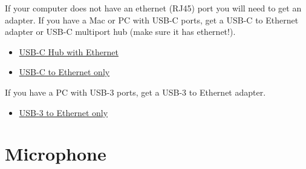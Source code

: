\begin{note}
If your computer does not have an ethernet (RJ45) port you will need to get an adapter.
If you have a Mac or PC with USB-C ports, get a USB-C to Ethernet adapter or USB-C multiport hub (make sure it has ethernet!).

\begin{itemize}
	\item \href{https://www.amazon.com/Adapter-Charging-Ethernet-Compatible-Thunderbolt/dp/B07TVSLDND/ref=sr_1_3?dchild=1&keywords=usb+c+hub+with+ethernet&qid=1597265719&refinements=p_72%3A2661618011&rnid=2661617011&sr=8-3}{USB-C Hub with Ethernet}
	\item \href{https://www.amazon.com/Anker-Ethernet-Portable-1-Gigabit-Chromebook/dp/B00ZZ6NW5E/ref=sr_1_5?dchild=1&keywords=usb+c+to+ethernet&qid=1597265911&sr=8-5}{USB-C to Ethernet only}
\end{itemize}


If you have a PC with USB-3 ports, get a USB-3 to Ethernet adapter.
\begin{itemize}
	\item \href{https://www.amazon.com/AmazonBasics-1000-Gigabit-Ethernet-Adapter/dp/B00M77HMU0/ref=sr_1_4?dchild=1&keywords=usb+3+to+ethernet&qid=1597266009&sr=8-4}{USB-3 to Ethernet only}
\end{itemize}

\end{note}

\section{Microphone}
\label{sec:equipment::mics}

